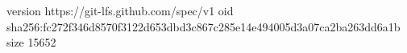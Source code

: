 version https://git-lfs.github.com/spec/v1
oid sha256:fc272f346d8570f3122d653dbd3c867c285e14e494005d3a07ca2ba263dd6a1b
size 15652
